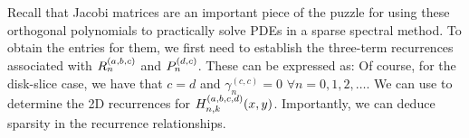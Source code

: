 Recall that Jacobi matrices are an important piece of the puzzle for using these orthogonal polynomials to practically solve PDEs in a sparse spectral method. To obtain the entries for them, we first need to establish the three-term recurrences associated with $R_n^{(a,b,c)}$ and ${P}_n^{(d,c)}$. These can be expressed as: 
Of course, for the disk-slice case, we have that $c = d$ and $\gamma_{n}^{(c,c)} = 0$ $\forall n=0,1,2,\dots$. We can use  to determine the 2D recurrences for $H_{n,k}^{(a,b,c,d)}(x,y)$. Importantly, we can deduce sparsity in the recurrence relationships.

